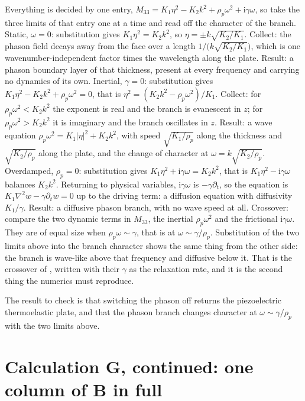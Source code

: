 \documentclass[11pt]{article}
\makeatletter
\newif\ifshowworked
\newenvironment{worked}{%
  \ifshowworked\par\smallskip\noindent\textit{Working.}\par\smallskip\else
  \setbox\z@\vbox\bgroup\fi}{\ifshowworked\par\smallskip\else\egroup\fi}
\newcommand{\ii}{\mathrm{i}}
\makeatother
\begin{document}
\begin{worked}
Everything is decided by one entry, $M_{33}=K_1\eta^2-K_2k^2+\rho_p\omega^2+\ii\gamma\omega$, so take the
three limits of that entry one at a time and read off the character of the branch.
Static, $\omega=0$: substitution gives $K_1\eta^2=K_2k^2$, so
$\eta=\pm k\sqrt{K_2/K_1}$. Collect: the phason field decays away from the face over a length
$1/\bigl(k\sqrt{K_2/K_1}\bigr)$, which is one wavenumber-independent factor times the wavelength along the
plate. Result: a phason boundary layer of that thickness, present at every frequency and carrying no
dynamics of its own.
Inertial, $\gamma=0$: substitution gives $K_1\eta^2-K_2k^2+\rho_p\omega^2=0$, that is
$\eta^2=(K_2k^2-\rho_p\omega^2)/K_1$. Collect: for $\rho_p\omega^2<K_2k^2$ the exponent is real and the
branch is evanescent in $z$; for $\rho_p\omega^2>K_2k^2$ it is imaginary and the branch oscillates in
$z$. Result: a wave equation
$\rho_p\omega^2=K_1|\eta|^2+K_2k^2$, with speed $\sqrt{K_1/\rho_p}$ along the thickness and
$\sqrt{K_2/\rho_p}$ along the plate, and the change of character at
$\omega=k\sqrt{K_2/\rho_p}$.
Overdamped, $\rho_p=0$: substitution gives $K_1\eta^2+\ii\gamma\omega=K_2k^2$, that is
$K_1\eta^2-\ii\gamma\omega$ balances $K_2k^2$. Returning to physical variables, $\ii\gamma\omega$ is
$-\gamma\partial_t$, so the equation is $K_1\nabla^2w-\gamma\partial_t w=0$ up to the driving term: a
diffusion equation with diffusivity $K_1/\gamma$. Result: a diffusive phason branch, with no wave speed
at all.
Crossover: compare the two dynamic terms in $M_{33}$, the inertial $\rho_p\omega^2$ and the frictional
$\ii\gamma\omega$. They are of equal size when $\rho_p\omega\sim\gamma$, that is at
$\omega\sim\gamma/\rho_p$. Substitution of the two limits above into the branch character shows the same
thing from the other side: the branch is wave-like above that frequency and diffusive below it. That is
the crossover of \cite[Eq.~(17)]{Baggioli2020}, written with their $\gamma$ as the relaxation rate, and it
is the second thing the numerics must reproduce.
\end{worked}

The result to check is that switching the phason off returns the piezoelectric thermoelastic plate, and
that the phason branch changes character at $\omega\sim\gamma/\rho_p$ with the two limits above.

\section{Calculation G, continued: one column of $\mathbf B$ in full}
\end{document}
